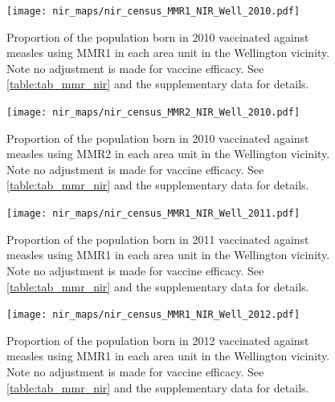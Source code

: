 \documentclass{article}
\begin{document}
\begin{figure}
\begin{center}
    \texttt{[image: nir\_maps/nir\_census\_MMR1\_NIR\_Well\_2010.pdf]}
\end{center}
    \caption{Proportion of the population born in 2010 vaccinated against measles using MMR1 in each area unit in the Wellington vicinity. Note no adjustment is made for vaccine efficacy. See \autoref{table:tab_mmr_nir} and the supplementary data for details.}
\label{fig:fig12010_w}
\end{figure}


\begin{figure}
\begin{center}
    \texttt{[image: nir\_maps/nir\_census\_MMR2\_NIR\_Well\_2010.pdf]}
 \end{center}
    \caption{Proportion of the population born in 2010 vaccinated against measles using MMR2 in each area unit in the Wellington vicinity. Note no adjustment is made for vaccine efficacy. See \autoref{table:tab_mmr_nir} and the supplementary data for details.}
\label{fig:fig22010_w}
\end{figure}


\begin{figure}
\begin{center}
    \texttt{[image: nir\_maps/nir\_census\_MMR1\_NIR\_Well\_2011.pdf]}
 \end{center}
    \caption{Proportion of the population born in 2011 vaccinated against measles using MMR1 in each area unit in the Wellington vicinity. Note no adjustment is made for vaccine efficacy. See \autoref{table:tab_mmr_nir} and the supplementary data for details.}
\label{fig:fig12011_w}
\end{figure}



\begin{figure}
\begin{center}
    \texttt{[image: nir\_maps/nir\_census\_MMR1\_NIR\_Well\_2012.pdf]}
 \end{center}
    \caption{Proportion of the population born in 2012 vaccinated against measles using MMR1 in each area unit in the Wellington vicinity. Note no adjustment is made for vaccine efficacy. See \autoref{table:tab_mmr_nir} and the supplementary data for details.}
\label{fig:fig12012_w}
\end{figure}
\end{document}
